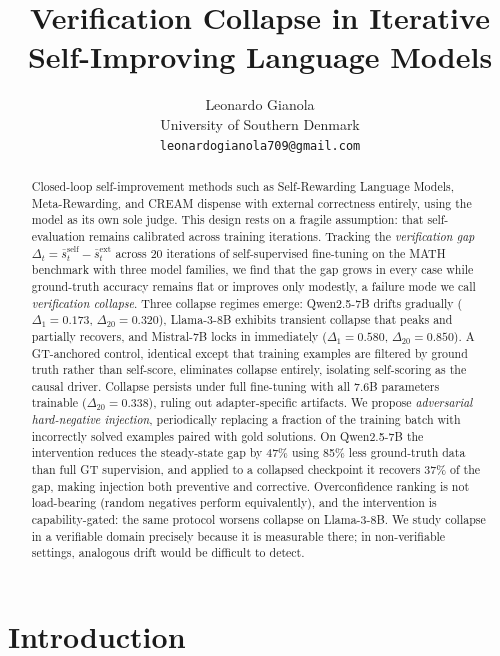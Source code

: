 \documentclass{article}
\title{Verification Collapse in Iterative Self-Improving Language Models}
\author{%
  Leonardo Gianola \\
  University of Southern Denmark \\
  \texttt{leonardogianola709@gmail.com}%
}
\begin{document}
\maketitle

\begin{abstract}
Closed-loop self-improvement methods such as Self-Rewarding Language Models,
Meta-Rewarding, and CREAM dispense with external correctness entirely, using the
model as its own sole judge.
This design rests on a fragile assumption: that self-evaluation remains
calibrated across training iterations.
Tracking the \emph{verification gap}
$\Delta_t = \bar{s}_t^{\text{self}} - \bar{s}_t^{\text{ext}}$ across 20
iterations of self-supervised fine-tuning on the MATH benchmark with three
model families, we find that the gap grows in every case while
ground-truth accuracy remains flat or improves only modestly, a failure mode we
call \emph{verification collapse}.
Three collapse regimes emerge: Qwen2.5-7B drifts gradually ($\Delta_1 = 0.173$,
$\Delta_{20} = 0.320$), Llama-3-8B exhibits transient collapse that peaks and
partially recovers, and Mistral-7B locks in immediately ($\Delta_1 = 0.580$,
$\Delta_{20} = 0.850$).
A GT-anchored control, identical except that training examples are filtered by
ground truth rather than self-score, eliminates collapse entirely, isolating
self-scoring as the causal driver.
Collapse persists under full fine-tuning with all 7.6B parameters trainable
($\Delta_{20} = 0.338$), ruling out adapter-specific artifacts.
We propose \emph{adversarial hard-negative injection}, periodically replacing a
fraction of the training batch with incorrectly solved examples paired with gold
solutions.
On Qwen2.5-7B the intervention reduces the steady-state gap by 47\% using 85\%
less ground-truth data than full GT supervision, and applied to a collapsed
checkpoint it recovers 37\% of the gap, making injection both preventive and
corrective.
Overconfidence ranking is not load-bearing (random negatives perform
equivalently), and the intervention is capability-gated: the same protocol
worsens collapse on Llama-3-8B.
We study collapse in a verifiable domain precisely because it is measurable
there; in non-verifiable settings, analogous drift would be difficult to detect.
\end{abstract}

\section{Introduction}
\label{sec:intro}
\end{document}
